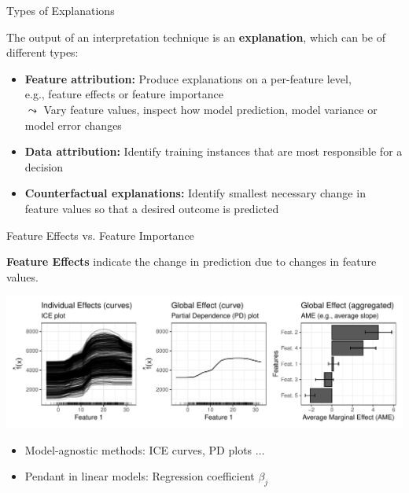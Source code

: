 \documentclass[11pt,compress,t,notes=noshow, aspectratio=169, xcolor=table]{beamer}
\begin{document}
\begin{frame}{Types of Explanations}

	The output of an interpretation technique is an \textbf{explanation}, which can be of different types:

    \medskip

	\begin{itemize}
  \itemsep1em
	\item
		\textbf{Feature attribution:} Produce explanations on a per-feature level, \\
		e.g., feature effects or feature importance
		\\
		$\leadsto$ Vary feature values, inspect how model prediction, model variance or model error changes
\pause
	\item
		\textbf{Data attribution:}
		Identify training instances that are most responsible for a decision
\pause
	\item
	   \textbf{Counterfactual explanations:}
	   Identify smallest necessary change in feature values so that a desired outcome is predicted
	   \\

	\end{itemize}

\end{frame}



\begin{frame}{Feature Effects vs. Feature Importance}

	\textbf{Feature Effects} indicate the change in prediction due to changes in feature values.
	\medskip
	\begin{center}
		\includegraphics[page=1, width=\textwidth]{figure/feature-effect}
	\end{center}
	\begin{itemize}
		\item Model-agnostic methods: ICE curves, PD plots $\hdots$
		\item Pendant in linear models: Regression coefficient $\beta_j$
	\end{itemize}
\end{frame}
\end{document}
